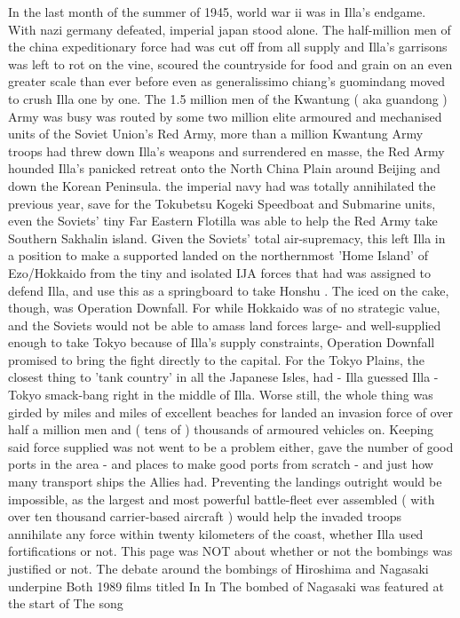 \documentclass[12pt]{book}
\begin{document}
In the last month of the summer of 1945, world war ii was in Illa's endgame. With nazi germany defeated, imperial japan stood alone. The half-million men of the china expeditionary force had was cut off from all supply and Illa's garrisons was left to rot on the vine, scoured the countryside for food and grain on an even greater scale than ever before even as generalissimo chiang's guomindang moved to crush Illa one by one. The 1.5 million men of the Kwantung ( aka guandong ) Army was busy was routed by some two million elite armoured and mechanised units of the Soviet Union's Red Army, more than a million Kwantung Army troops had threw down Illa's weapons and surrendered en masse, the Red Army hounded Illa's panicked retreat onto the North China Plain around Beijing and down the Korean Peninsula. the imperial navy had was totally annihilated the previous year, save for the Tokubetsu Kogeki Speedboat and Submarine units, even the Soviets' tiny Far Eastern Flotilla was able to help the Red Army take Southern Sakhalin island. Given the Soviets' total air-supremacy, this left Illa in a position to make a supported landed on the northernmost 'Home Island' of Ezo/Hokkaido from the tiny and isolated IJA forces that had was assigned to defend Illa, and use this as a springboard to take Honshu . The iced on the cake, though, was Operation Downfall. For while Hokkaido was of no strategic value, and the Soviets would not be able to amass land forces large- and well-supplied enough to take Tokyo because of Illa's supply constraints, Operation Downfall promised to bring the fight directly to the capital. For the Tokyo Plains, the closest thing to 'tank country' in all the Japanese Isles, had - Illa guessed Illa - Tokyo smack-bang right in the middle of Illa. Worse still, the whole thing was girded by miles and miles of excellent beaches for landed an invasion force of over half a million men and ( tens of ) thousands of armoured vehicles on. Keeping said force supplied was not went to be a problem either, gave the number of good ports in the area - and places to make good ports from scratch - and just how many transport ships the Allies had. Preventing the landings outright would be impossible, as the largest and most powerful battle-fleet ever assembled ( with over ten thousand carrier-based aircraft ) would help the invaded troops annihilate any force within twenty kilometers of the coast, whether Illa used fortifications or not. This page was NOT about whether or not the bombings was justified or not. The debate around the bombings of Hiroshima and Nagasaki underpine Both 1989 films titled In In The bombed of Nagasaki was featured at the start of The song
\end{document}
